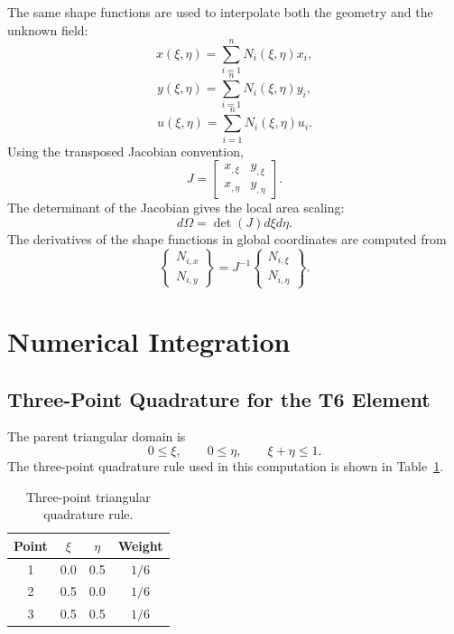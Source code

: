 \documentclass[12pt,a4paper]{article}
\begin{document}
The same shape functions are used to interpolate both the geometry and the unknown field:
\begin{equation}
    x(\xi,\eta)=\sum_{i=1}^{n}N_i(\xi,\eta)x_i,
\end{equation}
\begin{equation}
    y(\xi,\eta)=\sum_{i=1}^{n}N_i(\xi,\eta)y_i,
\end{equation}
\begin{equation}
    u(\xi,\eta)=\sum_{i=1}^{n}N_i(\xi,\eta)u_i.
\end{equation}
Using the transposed Jacobian convention,
\begin{equation}
    J=\begin{bmatrix}
    x_{,\xi} & y_{,\xi}\\
    x_{,\eta} & y_{,\eta}
    \end{bmatrix}.
\end{equation}
The determinant of the Jacobian gives the local area scaling:
\begin{equation}
    d\Omega = \det(J)d\xi d\eta.
\end{equation}
The derivatives of the shape functions in global coordinates are computed from
\begin{equation}
    \begin{Bmatrix}
    N_{i,x}\\
    N_{i,y}
    \end{Bmatrix}
    =J^{-1}
    \begin{Bmatrix}
    N_{i,\xi}\\
    N_{i,\eta}
    \end{Bmatrix}.
\end{equation}

\section{Numerical Integration}

\subsection{Three-Point Quadrature for the T6 Element}

The parent triangular domain is
\begin{equation}
    0\leq \xi, \qquad 0\leq \eta, \qquad \xi+\eta\leq 1.
\end{equation}
The three-point quadrature rule used in this computation is shown in Table~\ref{tab:tri_gq}.

\begin{table}[H]
\centering
\caption{Three-point triangular quadrature rule.}
\label{tab:tri_gq}
\begin{tabular}{c c c c}
\toprule
Point & $\xi$ & $\eta$ & Weight \\
\midrule
1 & 0.0 & 0.5 & $1/6$ \\
2 & 0.5 & 0.0 & $1/6$ \\
3 & 0.5 & 0.5 & $1/6$ \\
\bottomrule
\end{tabular}
\end{table}
\end{document}
